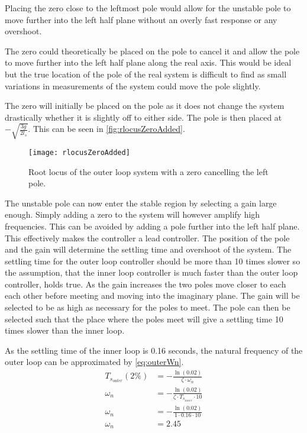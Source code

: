 Placing the zero close to the leftmost pole would allow for the unstable pole to move further into the left half plane without an overly fast response or any overshoot. 

The zero could theoretically be placed on the pole to cancel it and allow the pole to move further into the left half plane along the real axis. This would be ideal but the true location of the pole of the real system is difficult to find as small variations in measurements of the system could move the pole slightly. 

The zero will initially be placed on the pole as it does not change the system drastically whether it is slightly off to either side. The pole is then placed at $-\sqrt{\frac{3g}{2l_s}}$. This can be seen in \autoref{fig:rlocusZeroAdded}.

\begin{figure}[htbp]
\centering
\texttt{[image: rlocusZeroAdded]}
\caption{Root locus of the outer loop system with a zero cancelling the left pole.}
\label{fig:rlocusZeroAdded}
\end{figure}

The unstable pole can now enter the stable region by selecting a gain large enough. Simply adding a zero to the system will however amplify high frequencies. This can be avoided by adding a pole further into the left half plane. This effectively makes the controller a lead controller. The position of the pole and the gain will determine the settling time and overshoot of the system. The settling time for the outer loop controller should be more than 10 times slower so the assumption, that the inner loop controller is much faster than the outer loop controller, holds true. As the gain increases the two poles move closer to each each other before meeting and moving into the imaginary plane. The gain will be selected to be as high as necessary for the poles to meet. The pole can then be selected such that the place where the poles meet will give a settling time 10 times slower than the inner loop.

As the settling time of the inner loop is 0.16 seconds, the natural frequency of the outer loop can be approximated by \autoref{eq:outerWn}. 
\begin{subequations} \label{eq:outerWn}
\begin{flalign}
T_{s_{outer}}(2\%) &=-\frac{\ln(0.02)}{\zeta\cdot \omega_n} \\
\omega_n &=-\frac{\ln(0.02)}{\zeta\cdot T_{s_{inner}}\cdot 10} \\
\omega_n &=-\frac{\ln(0.02)}{1\cdot 0.16 \cdot 10} \\
\omega_n &=2.45
\end{flalign}
\end{subequations}

